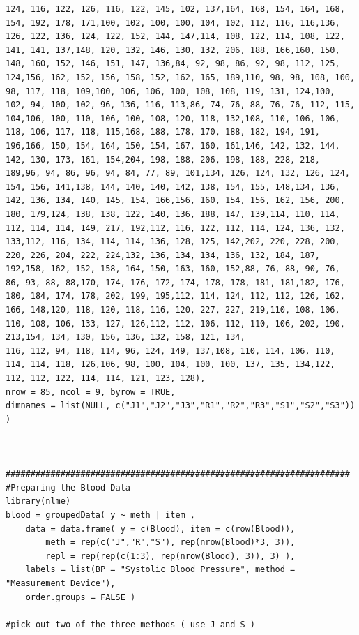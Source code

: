 \documentclass[12pt, a4paper]{report}
\theoremstyle{plain}
\theoremstyle{definition}
\theoremstyle{remark}
\begin{document}
\begin{framed}
\begin{verbatim}
124, 116, 122, 126, 116, 122, 145, 102, 137,164, 168, 154, 164, 168, 154, 192, 178, 171,100, 102, 100, 100, 104, 102, 112, 116, 116,136, 126, 122, 136, 124, 122, 152, 144, 147,114, 108, 122, 114, 108, 122, 141, 141, 137,148, 120, 132, 146, 130, 132, 206, 188, 166,160, 150, 148, 160, 152, 146, 151, 147, 136,84, 92, 98, 86, 92, 98, 112, 125, 124,156, 162, 152, 156, 158, 152, 162, 165, 189,110, 98, 98, 108, 100, 98, 117, 118, 109,100, 106, 106, 100, 108, 108, 119, 131, 124,100, 102, 94, 100, 102, 96, 136, 116, 113,86, 74, 76, 88, 76, 76, 112, 115, 104,106, 100, 110, 106, 100, 108, 120, 118, 132,108, 110, 106, 106, 118, 106, 117, 118, 115,168, 188, 178, 170, 188, 182, 194, 191, 196,166, 150, 154, 164, 150, 154, 167, 160, 161,146, 142, 132, 144, 142, 130, 173, 161, 154,204, 198, 188, 206, 198, 188, 228, 218, 189,96, 94, 86, 96, 94, 84, 77, 89, 101,134, 126, 124, 132, 126, 124, 154, 156, 141,138, 144, 140, 140, 142, 138, 154, 155, 148,134, 136, 142, 136, 134, 140, 145, 154, 166,156, 160, 154, 156, 162, 156, 200, 180, 179,124, 138, 138, 122, 140, 136, 188, 147, 139,114, 110, 114, 112, 114, 114, 149, 217, 192,112, 116, 122, 112, 114, 124, 136, 132, 133,112, 116, 134, 114, 114, 136, 128, 125, 142,202, 220, 228, 200, 220, 226, 204, 222, 224,132, 136, 134, 134, 136, 132, 184, 187, 192,158, 162, 152, 158, 164, 150, 163, 160, 152,88, 76, 88, 90, 76, 86, 93, 88, 88,170, 174, 176, 172, 174, 178, 178, 181, 181,182, 176, 180, 184, 174, 178, 202, 199, 195,112, 114, 124, 112, 112, 126, 162, 166, 148,120, 118, 120, 118, 116, 120, 227, 227, 219,110, 108, 106, 110, 108, 106, 133, 127, 126,112, 112, 106, 112, 110, 106, 202, 190, 213,154, 134, 130, 156, 136, 132, 158, 121, 134,
116, 112, 94, 118, 114, 96, 124, 149, 137,108, 110, 114, 106, 110, 114, 114, 118, 126,106, 98, 100, 104, 100, 100, 137, 135, 134,122, 112, 112, 122, 114, 114, 121, 123, 128), 
nrow = 85, ncol = 9, byrow = TRUE,
dimnames = list(NULL, c("J1","J2","J3","R1","R2","R3","S1","S2","S3")) )



#####################################################################
#Preparing the Blood Data
library(nlme)
blood = groupedData( y ~ meth | item ,
    data = data.frame( y = c(Blood), item = c(row(Blood)),
        meth = rep(c("J","R","S"), rep(nrow(Blood)*3, 3)),
        repl = rep(rep(c(1:3), rep(nrow(Blood), 3)), 3) ),
    labels = list(BP = "Systolic Blood Pressure", method = "Measurement Device"),
    order.groups = FALSE )
 
#pick out two of the three methods ( use J and S ) 
   

\end{verbatim}
\end{framed}
\end{document}
